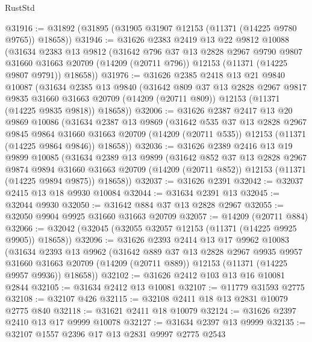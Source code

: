 \begin{lexlean}{RustStd}
\begin{coremodule}
@31916 := @31892 (@31895 (@31905 @31907 @12153 (@11371 (@14225 @9780 @9765)) @18658))
@31946 := @31626
    @2383
    @2419
    @13
    @22
    @9812
    @10088
    (@31634
      @2383
      @13
      @9812
      (@31642
        @796
        @37
        @13
        @2828
        @2967
        @9790
        @9807
        @31660
        @31663
        @20709
        (@14209 (@20711 @796))
        @12153
        (@11371 (@14225 @9807 @9791))
        @18658))
@31976 := @31626
    @2385
    @2418
    @13
    @21
    @9840
    @10087
    (@31634
      @2385
      @13
      @9840
      (@31642
        @809
        @37
        @13
        @2828
        @2967
        @9817
        @9835
        @31660
        @31663
        @20709
        (@14209 (@20711 @809))
        @12153
        (@11371 (@14225 @9835 @9818))
        @18658))
@32006 := @31626
    @2387
    @2417
    @13
    @20
    @9869
    @10086
    (@31634
      @2387
      @13
      @9869
      (@31642
        @535
        @37
        @13
        @2828
        @2967
        @9845
        @9864
        @31660
        @31663
        @20709
        (@14209 (@20711 @535))
        @12153
        (@11371 (@14225 @9864 @9846))
        @18658))
@32036 := @31626
    @2389
    @2416
    @13
    @19
    @9899
    @10085
    (@31634
      @2389
      @13
      @9899
      (@31642
        @852
        @37
        @13
        @2828
        @2967
        @9874
        @9894
        @31660
        @31663
        @20709
        (@14209 (@20711 @852))
        @12153
        (@11371 (@14225 @9894 @9875))
        @18658))
@32037 := @31626 @2391
@32042 := @32037 @2415 @13 @18 @9930 @10084
@32044 := @31634 @2391 @13
@32045 := @32044 @9930
@32050 := @31642 @884 @37 @13 @2828 @2967
@32055 := @32050 @9904 @9925 @31660 @31663 @20709
@32057 := @14209 (@20711 @884)
@32066 := @32042 (@32045 (@32055 @32057 @12153 (@11371 (@14225 @9925 @9905)) @18658))
@32096 := @31626
    @2393
    @2414
    @13
    @17
    @9962
    @10083
    (@31634
      @2393
      @13
      @9962
      (@31642
        @889
        @37
        @13
        @2828
        @2967
        @9935
        @9957
        @31660
        @31663
        @20709
        (@14209 (@20711 @889))
        @12153
        (@11371 (@14225 @9957 @9936))
        @18658))
@32102 := @31626 @2412 @103 @13 @16 @10081 @2844
@32105 := @31634 @2412 @13 @10081
@32107 := @11779 @31593 @2775
@32108 := @32107 @426
@32115 := @32108 @2411 @18 @13 @2831 @10079 @2775 @840
@32118 := @31621 @2411 @18 @10079
@32124 := @31626 @2397 @2410 @13 @17 @9999 @10078
@32127 := @31634 @2397 @13 @9999
@32135 := @32107 @1557 @2396 @17 @13 @2831 @9997 @2775 @2543

\end{coremodule}
\end{lexlean}
